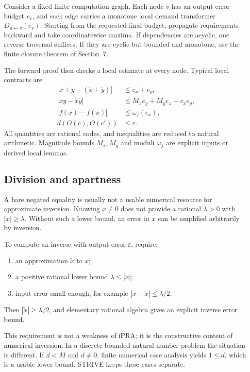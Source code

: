 Consider a fixed finite computation graph.  Each node \(v\) has an output error
budget \(e_v\), and each edge carries a monotone local demand transformer
\(D_{u\leftarrow v}(e_v)\).  Starting from the requested final budget, propagate
requirements backward and take coordinatewise maxima.  If dependencies are
acyclic, one reverse traversal suffices.  If they are cyclic but bounded and
monotone, use the finite closure theorem of Section~7.

The forward proof then checks a local estimate at every node.  Typical local
contracts are
\begin{align*}
 |x+y-(\tilde x+\tilde y)|&\le e_x+e_y,\\
 |xy-\tilde x\tilde y|&\le M_xe_y+M_ye_x+e_xe_y,\\
 |f(x)-f(\tilde x)|&\le\omega_f(e_x),\\
 d(O(c),O(c'))&\le\varepsilon.
\end{align*}
All quantities are rational codes, and inequalities are reduced to natural
arithmetic.  Magnitude bounds \(M_x,M_y\) and moduli \(\omega_f\) are explicit
inputs or derived local lemmas.

\subsection{Division and apartness}

A bare negated equality is usually not a usable numerical resource for
approximate inversion.  Knowing \(x\ne0\) does not provide a rational
\(\lambda>0\) with \(|x|\ge\lambda\).  Without such a lower bound, an error in
\(x\) can be amplified arbitrarily by inversion.

\begin{contract}
To compute an inverse with output error \(\varepsilon\), require:
\begin{enumerate}
\item an approximation \(\tilde x\) to \(x\);
\item a positive rational lower bound \(\lambda\le |x|\);
\item input error small enough, for example \(|x-\tilde x|\le\lambda/2\).
\end{enumerate}
Then \(|\tilde x|\ge\lambda/2\), and elementary rational algebra gives an
explicit inverse error bound.
\end{contract}

This requirement is not a weakness of iPRA; it is the constructive content of
numerical inversion.  In a discrete bounded natural-number problem the
situation is different.  If \(d<M\) and \(d\ne0\), finite numerical
case analysis yields \(1\le d\), which is a usable lower bound.  STRIVE keeps
these cases separate.

